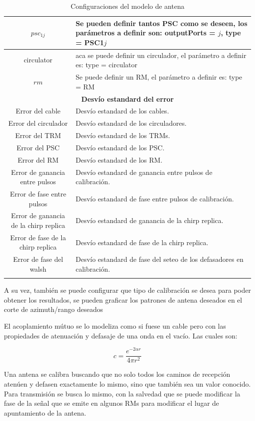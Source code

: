 \begin{center}
\begin{longtable}{|c|p{9cm}|}
	$psc_{1j}$ & Se pueden definir tantos PSC como se deseen, los parámetros a definir son: outputPorts = $j$, type = PSC1$j$ \tabularnewline \hline 
	circulator & aca se puede definir un circulador, el parámetro a definir es: type = circulator \tabularnewline \hline 
	$rm$ & Se puede definir un RM, el parámetro a definir es: type = RM \tabularnewline \hline 
	\multicolumn{2}{|c|}{\textbf{Desvío estandard del error}} \\
	\hline
	Error del cable & Desvío estandard de los cables. \tabularnewline \hline 
	Error del circulador & Desvío estandard de los circuladores. \tabularnewline \hline 
	Error del TRM & Desvío estandard de los TRMs. \tabularnewline \hline 
	Error del PSC & Desvío estandard de los PSC. \tabularnewline \hline 
	Error del RM & Desvío estandard de los RM. \tabularnewline \hline 
	Error de ganancia entre pulsos & Desvío estandard de ganancia entre pulsos de calibración. \tabularnewline \hline 
	Error de fase entre pulsos & Desvío estandard de fase entre pulsos de calibración. \tabularnewline \hline 
	Error de ganancia de la chirp replica & Desvío estandard de ganancia de la chirp replica. \tabularnewline \hline 
	Error de fase de la chirp replica & Desvío estandard de fase de la chirp replica. \tabularnewline \hline 
	Error de fase del walsh & Desvío estandard de fase del seteo de los defasadores en calibración. \tabularnewline \hline 
	\caption{Configuraciones del modelo de antena}
  \end{longtable}
  \label{tab:conf_modelo_antena}
\end{center}

A su vez, también se puede configurar que tipo de calibración se desea para poder obtener los resultados, se pueden graficar 
los patrones de antena deseados en el corte de azimuth/rango deseados 

El acoplamiento mútuo se lo modeliza como si fuese un cable pero con las propiedades de atenuación y defasaje de una onda en
el vacío. Las cuales son:

\begin{equation}
	c = \dfrac{e^{-2\alpha r}}{4\pi r^2}
\end{equation}





Una antena se calibra buscando que no solo todos los caminos de recepción atenúen y defasen exactamente lo mismo, sino que 
también sea un valor conocido. Para transmisión se busca lo mismo, con la salvedad que se puede modificar la fase de la 
señal que se emite en algunos RMs para modificar el lugar de apuntamiento de la antena.

